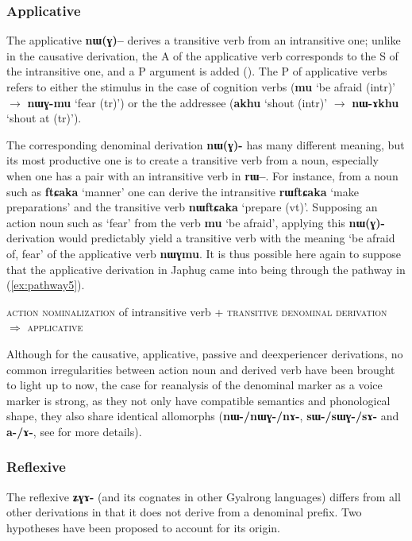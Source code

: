 \documentclass[oldfontcommands,oneside,a4paper,11pt]{article}
\newcommand{\ipa}[1]{\mbox{\phon\textbf{#1}}} %
\begin{document}
\subsubsection{Applicative} \label{sec:appl}
The applicative \ipa{nɯ(ɣ)--} derives a transitive verb from an intransitive one; unlike in the causative derivation, the A of the applicative verb corresponds to the S of the intransitive one, and a P argument is added (\citealt{jacques13tropative}). The P of applicative verbs refers to either the stimulus in the case of cognition verbs (\ipa{mu} `be afraid (intr)' $\rightarrow$ \ipa{nɯɣ-mu} `fear (tr)') or the the addressee (\ipa{akhu} `shout (intr)'  $\rightarrow$ \ipa{nɯ-ɤkhu} `shout at (tr)'). 

The corresponding denominal derivation \ipa{nɯ(ɣ)-} has many different meaning, but its most productive one is to create a transitive verb from a noun, especially when one has a pair with an intransitive verb in \ipa{rɯ--}. For instance, from a noun such as \ipa{ftɕaka} `manner' one can derive the intransitive \ipa{rɯftɕaka} `make preparations' and the transitive verb \ipa{nɯftɕaka} `prepare (vt)'. Supposing an action noun such as `fear' from the verb \ipa{mu}  `be afraid', applying this \ipa{nɯ(ɣ)-} derivation would predictably yield a transitive verb with the meaning `be afraid of, fear' of the applicative verb \ipa{nɯɣmu}. It is thus possible here again to suppose that the applicative derivation in Japhug came into being through the pathway in (\ref{ex:pathway5}).

\begin{exe}
\ex \label{ex:pathway5}
\glt \textsc{action nominalization} of intransitive verb + \textsc{transitive denominal derivation} $\Rightarrow$ \textsc{applicative}
\end{exe}

Although for the causative, applicative, passive and deexperiencer derivations, no common irregularities between action noun and derived verb have been brought to light up to now, the case for reanalysis of the denominal marker as a voice marker is strong, as they not only have compatible semantics and phonological shape, they also share identical allomorphs (\ipa{nɯ-/nɯɣ-/nɤ-}, \ipa{sɯ-/sɯɣ-/sɤ-} and \ipa{a-/ɤ-}, see \citealt{jacques13tropative, jacques15causative, jacques07passif} for more details). 


\subsubsection{Reflexive} \label{sec:refl}
The reflexive \ipa{ʑɣɤ-} (and its cognates in other Gyalrong languages) differs from all other derivations in that it does not derive from a denominal prefix. Two hypotheses have been proposed to account for its origin. 
\end{document}
